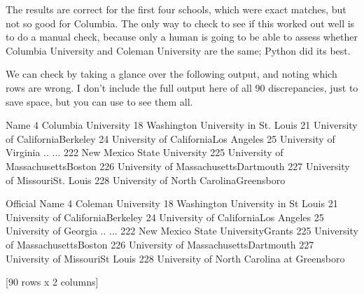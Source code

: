 \documentclass[letterpaper,10pt,english]{jupyterBook}
\begin{document}
\sphinxAtStartPar
The results are correct for the first four schools, which were exact matches, but not so good for Columbia.  The only way to check to see if this worked out well is to do a manual check, because only a human is going to be able to assess whether Columbia University and Coleman University are the same; Python did its best.

\sphinxAtStartPar
We can check by taking a glance over the following output, and noting which rows are wrong.  I don’t include the full output here of all 90 discrepancies, just to save space, but you can use  to see them all.

\begin{sphinxVerbatim}[commandchars=\\\{\}]
  \PYG{p}{[} \PYG{p}{[}\PYG{p}{]}  \PYG{p}{[}\PYG{p}{]} \PYG{p}{]}
\PYG{p}{[}\PYG{p}{[}\PYG{p}{]}\PYG{p}{]}
\end{sphinxVerbatim}

\begin{sphinxVerbatim}[commandchars=\\\{\}]
                                         Name  \PYGZbs{}
4                         Columbia University   
18         Washington University in St. Louis   
21         University of California\PYGZhy{}\PYGZhy{}Berkeley   
24      University of California\PYGZhy{}\PYGZhy{}Los Angeles   
25                     University of Virginia   
..                                        ...   
222               New Mexico State University   
225       University of Massachusetts\PYGZhy{}\PYGZhy{}Boston   
226    University of Massachusetts\PYGZhy{}\PYGZhy{}Dartmouth   
227         University of Missouri\PYGZhy{}\PYGZhy{}St. Louis   
228  University of North Carolina\PYGZhy{}\PYGZhy{}Greensboro   

                                  Official Name  
4                            Coleman University  
18            Washington University in St Louis  
21            University of California\PYGZhy{}Berkeley  
24         University of California\PYGZhy{}Los Angeles  
25                        University of Georgia  
..                                          ...  
222          New Mexico State University\PYGZhy{}Grants  
225          University of Massachusetts\PYGZhy{}Boston  
226       University of Massachusetts\PYGZhy{}Dartmouth  
227             University of Missouri\PYGZhy{}St Louis  
228  University of North Carolina at Greensboro  

[90 rows x 2 columns]
\end{sphinxVerbatim}
\end{document}
